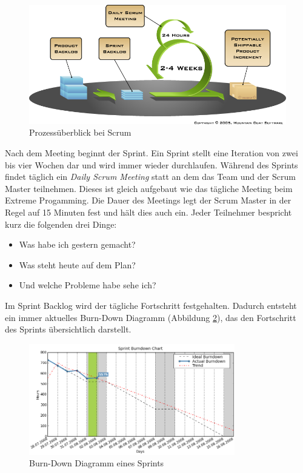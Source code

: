 \begin{figure}[h]
  \centering
  \includegraphics[width=1\textwidth]{images/scrum}
  \caption{Prozessüberblick bei Scrum \cite{bib:mountaingoat}}
  \label{fig:scrum}
\end{figure}

Nach dem Meeting beginnt der Sprint. Ein Sprint stellt eine Iteration von zwei bis vier Wochen dar und wird immer wieder durchlaufen. Während des Sprints findet täglich ein \emph{Daily Scrum Meeting} statt an dem das Team und der Scrum Master teilnehmen. Dieses ist gleich aufgebaut wie das tägliche Meeting beim Extreme Progamming. Die Dauer des Meetings legt der Scrum Master in der Regel auf 15 Minuten fest und hält dies auch ein. Jeder Teilnehmer bespricht kurz die folgenden drei Dinge: 
\begin{itemize}
  \item Was habe ich gestern gemacht? 
  \item Was steht heute auf dem Plan? 
  \item Und welche Probleme habe sehe ich?
\end{itemize}
Im Sprint Backlog wird der tägliche Fortschritt festgehalten. Dadurch entsteht ein immer aktuelles Burn-Down Diagramm (Abbildung \ref{fig:burndown}), das den Fortschritt des Sprints übersichtlich darstellt. 

\begin{figure}[h]
  \centering
  \includegraphics[width=0.8\textwidth]{images/burndown}
  \caption{Burn-Down Diagramm eines Sprints \cite{bib:agilo}}
  \label{fig:burndown}
\end{figure}

